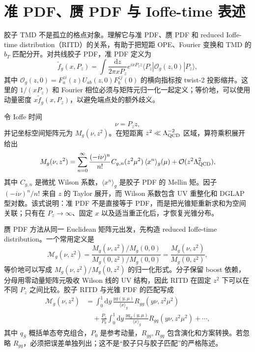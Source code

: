 \documentclass[UTF8,12pt,a4paper,twoside,openany]{ctexbook}
\newcommand{\dd}{\mathrm{d}}
\begin{document}
\section{准 PDF、赝 PDF 与 Ioffe-time 表述}

胶子 TMD 不是孤立的格点对象。理解它与准 PDF、赝 PDF 和 reduced Ioffe-time distribution（RITD）的关系，有助于把短距 OPE、Fourier 变换和 TMD 的 \(b_T\) 匹配分开。对共线胶子 PDF，准 PDF 定义为
\begin{equation}
  \tilde f_g(x,P_z)
  =\int\frac{\dd z}{2\pi xP_z}
  e^{ixP_z z}
  \langle P_z|\mathcal O_g(z,0)|P_z\rangle ,
  \label{eq:quasipdf}
\end{equation}
其中 \(\mathcal O_g(z,0)=F^{zi}_a(z)U_{ab}(z,0)F^{zj}_b(0)\) 的横向指标按 twist-2 投影缩并。这里的 \(1/(xP_z)\) 和 Fourier 相位必须与矩阵元归一化一起定义；等价地，可以使用动量密度 \(x\tilde f_g(x,P_z)\)，以避免端点处的额外歧义。

令 Ioffe 时间
\begin{equation}
  \nu=P_z z,
  \label{eq:Ioffe}
\end{equation}
并记坐标空间矩阵元为 \(M_g(\nu,z^2)\)。在短距离 \(z^2\ll\Lambda_{\rm QCD}^{-2}\) 区域，算符乘积展开给出
\begin{equation}
  M_g(\nu,z^2)
  =\sum_{n=0}^{\infty}\frac{(-i\nu)^n}{n!}
  C_{g,n}(z^2\mu^2)\,
  \langle x^n\rangle_g(\mu)
  +\mathcal O(z^2\Lambda_{\rm QCD}^2),
  \label{eq:OPEgluon}
\end{equation}
其中 \(C_{g,n}\) 是微扰 Wilson 系数，\(\langle x^n\rangle_g\) 是胶子 PDF 的 Mellin 矩。因子 \((-i\nu)^n/n!\) 来自 \(z\) 的 Taylor 展开，而 Wilson 系数包含 UV 重整化和 DGLAP 型对数。该式说明：准 PDF 不是直接等于 PDF，而是把光锥矩重新求和为空间关联；只有在 \(P_z\to\infty\)、固定 \(x\) 以及适当重正化后，才恢复光锥分布\cite{Ji2013,Ji2014,Izubuchi2018,JiReview2021}。

赝 PDF 方法从同一 Euclidean 矩阵元出发，先构造 reduced Ioffe-time distribution。一个常用定义是
\begin{equation}
  \mathscr M_g(\nu,z^2)
  =\frac{M_g(\nu,z^2)/M_g(0,0)}
  {M_g(0,z^2)/M_g(0,0)}
  =\frac{M_g(\nu,z^2)}{M_g(0,z^2)},
  \label{eq:RITDdef}
\end{equation}
等价地可以写成 \(M_g(\nu,z^2)/M_g(0,z^2)\) 的归一化形式。分子保留 boost 依赖，分母用零动量矩阵元吸收 Wilson 线的 UV 结构，因此 RITD 在固定 \(z^2\) 下可以在不同 \(P_z\) 之间比较。胶子 RITD 与光锥 PDF 的匹配写成
\begin{align}
  \mathscr M_g(\nu,z^2)
  &=\int_0^1\dd y\,\frac{y g(y,\mu)}{\langle x\rangle_g}
  R_{gg}(y\nu,z^2\mu^2)\nonumber\\
  &\quad+\frac{P_z}{P_0}\int_0^1\dd y\,
  \frac{y q_S(y,\mu)}{\langle x\rangle_g}
  R_{gq}(y\nu,z^2\mu^2)+\cdots,
  \label{eq:RITDmatching}
\end{align}
其中 \(q_S\) 概括单态夸克组合，\(P_0\) 是参考动量，\(R_{gg},R_{gq}\) 包含演化和方案转换。若忽略 \(R_{gq}\)，必须把误差单独列出；这不是“胶子只与胶子匹配”的严格陈述。
\end{document}
